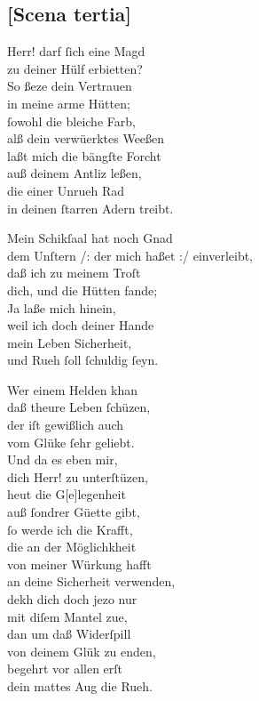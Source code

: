 \documentclass{ees}
\newenvironment{lyrics}[1]{%
  \subsection{#1}\nopagebreak%
  \begin{lyricslist}%
  \let\voice\item%
}{%
  \end{lyricslist}%
}
\begin{document}
\begin{lyrics}{[Scena tertia]}
  \voice[Jahel]
  Herr! darf ſich eine Magd\\
  zu deiner Hülf erbietten?\\
  So ßeze dein Vertrauen\\
  in meine arme Hütten;\\
  ſowohl die bleiche Farb,\\
  alß dein verwüerktes Weeßen\\
  laßt mich die bängſte Forcht\\
  auß deinem Antliz leßen,\\
  die einer Unrueh Rad\\
  in deinen ſtarren Adern treibt.

  \voice[Sisera]
  Mein Schikſaal hat noch Gnad\\
  dem Unſtern /: der mich haßet :/ einverleibt,\\
  daß ich zu meinem Troſt\\
  dich, und die Hütten fande;\\
  Ja laße mich hinein,\\
  weil ich doch deiner Hande\\
  mein Leben Sicherheit,\\
  und Rueh ſoll ſchuldig ſeyn.

  \voice[Jahel]
  Wer einem Helden khan\\
  daß theure Leben ſchüzen,\\
  der iſt gewißlich auch\\
  vom Glüke ſehr geliebt.\\
  Und da es eben mir,\\
  dich Herr! zu unterſtüzen,\\
  heut die G[e]legenheit\\
  auß ſondrer Güette gibt,\\
  ſo werde ich die Krafft,\\
  die an der Möglichkheit\\
  von meiner Würkung hafft\\
  an deine Sicherheit verwenden,\\
  dekh dich doch jezo nur\\
  mit diſem Mantel zue,\\
  dan um daß Widerſpill\\
  von deinem Glük zu enden,\\
  begehrt vor allen erſt\\
  dein mattes Aug die Rueh.


\end{lyrics}
\end{document}
